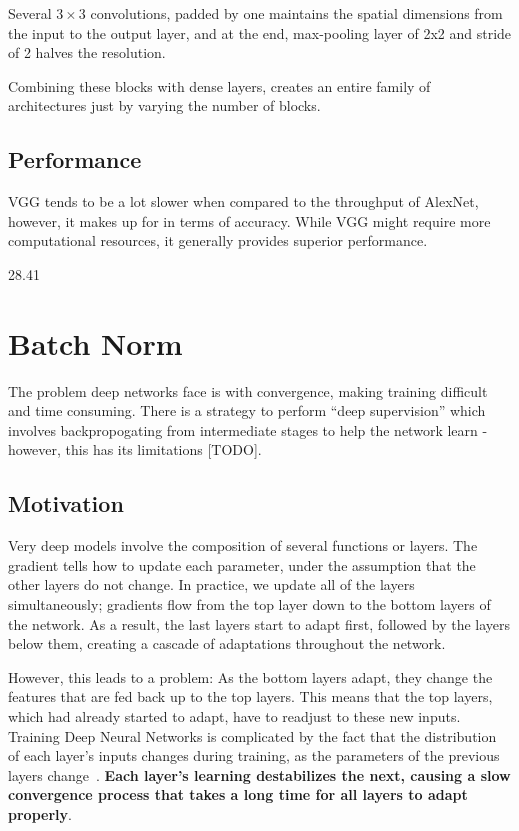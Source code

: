 \documentclass[11pt]{article}
\begin{document}
Several $3\times 3$ convolutions, padded by one maintains the spatial dimensions from the input to the output layer, and at the end, max-pooling layer of 2x2 and stride of 2 halves the resolution. 

Combining these blocks with dense layers, creates an entire family of architectures just by varying the number of blocks.

\subsection{Performance}

VGG tends to be a lot slower when compared to the throughput of AlexNet, however, it makes up for in terms of accuracy. While VGG might require more computational resources, it generally provides superior performance.

\begin{warning}
    28.41
\end{warning}

\section{Batch Norm}

The problem deep networks face is with convergence, making training difficult and time consuming. There is a strategy to perform ``deep supervision'' which involves backpropogating from intermediate stages to help the network learn - however, this has its limitations [TODO].

\subsection{Motivation}

Very deep models involve the composition of several functions or layers. The gradient tells how to update each parameter, under the assumption that the other layers do not change. In practice, we update all of the layers simultaneously; gradients flow from the top layer down to the bottom layers of the network. As a result, the last layers start to adapt first, followed by the layers below them, creating a cascade of adaptations throughout the network. 

However, this leads to a problem: As the bottom layers adapt, they change the features that are fed back up to the top layers. This means that the top layers, which had already started to adapt, have to readjust to these new inputs. Training Deep Neural Networks is complicated by the fact that the distribution of each layer's inputs changes during training, as the parameters of the previous layers change~\cite{Goodfellow-et-al-2016}. \textbf{Each layer's learning destabilizes the next, causing a slow convergence process that takes a long time for all layers to adapt properly}.
\end{document}
